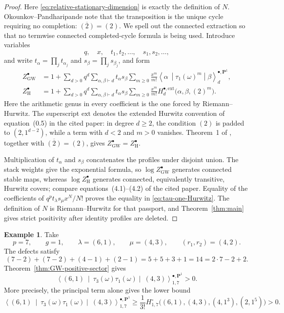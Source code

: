 \documentclass[11pt]{amsart}
\theoremstyle{plain}
\theoremstyle{definition}
\newtheorem{example}[theorem]{Example}
\numberwithin{equation}{section}
\begin{document}
\begin{proof}
Here \eqref{eq:relative-stationary-dimension} is exactly the definition of
$N$.  Okounkov--Pandharipande note that the transposition is the unique
cycle requiring no completion: $\overline{(2)}=(2)$.  We spell out the
connected extraction so that no termwise connected completed-cycle formula
is being used.  Introduce variables
\[
 q,\quad x,\quad t_1,t_2,\ldots,\quad s_1,s_2,\ldots,
\]
and write $t_\alpha=\prod_jt_{\alpha_j}$ and
$s_\beta=\prod_js_{\beta_j}$, and form
\begin{align*}
 Z^\bullet_{\mathrm{GW}}
 &=1+\sum_{d>0}q^d\sum_{\alpha,\beta\vdash d}
   t_\alpha s_\beta\sum_{m\geq0}\frac{x^m}{m!}
   \left\langle\alpha\ \middle|\tau_1(\omega)^m
   \middle|\beta\right\rangle^{\bullet,\mathbf P^1}_{d},\\
 Z^\bullet_{\mathrm H}
 &=1+\sum_{d>0}q^d\sum_{\alpha,\beta\vdash d}
   t_\alpha s_\beta\sum_{m\geq0}\frac{x^m}{m!}
   H^{\bullet,\mathrm{ext}}_d\bigl(\alpha,\beta,(2)^m\bigr).
\end{align*}
Here the arithmetic genus in every coefficient is the one forced by
Riemann--Hurwitz.  The superscript $\mathrm{ext}$ denotes the extended
Hurwitz convention of equation~(0.5) in the cited paper: in degree
$d\geq2$, the condition $(2)$ is padded to $(2,1^{d-2})$, while a term with
$d<2$ and $m>0$ vanishes.  Theorem~1 of
\cite{OkounkovPandharipande}, together with
$\overline{(2)}=(2)$, gives
$Z^\bullet_{\mathrm{GW}}=Z^\bullet_{\mathrm H}$.

Multiplication of $t_\alpha$ and $s_\beta$ concatenates the profiles under
disjoint union.  The stack weights give the exponential formula, so
$\log Z^\bullet_{\mathrm{GW}}$ generates connected stable maps, whereas
$\log Z^\bullet_{\mathrm H}$ generates connected, equivalently transitive,
Hurwitz covers; compare equations~(4.1)--(4.2) of the cited paper.  Equality
of the coefficients of $q^pt_\lambda s_\mu x^N/N!$ proves the equality in
\eqref{eq:tau-one-Hurwitz}.  The definition of $N$ is Riemann--Hurwitz for
that passport, and Theorem~\ref{thm:main} gives strict positivity after
identity profiles are deleted.
\end{proof}

\begin{example}\label{ex:degree-seven-GW}
Take
\[
 p=7,\qquad g=1,\qquad
 \lambda=(6,1),\qquad \mu=(4,3),\qquad (r_1,r_2)=(4,2).
\]
The defects satisfy
\[
 (7-2)+(7-2)+(4-1)+(2-1)=5+5+3+1=14=2\cdot7-2+2.
\]
Theorem~\ref{thm:GW-positive-sector} gives
\[
 \left\langle(6,1)\ \middle|\
  \tau_3(\omega)\tau_1(\omega)
  \middle|\ (4,3)\right\rangle^{\bullet,\mathbf P^1}_{1,7}>0.
\]
More precisely, the principal term alone gives the lower bound
\[
 \left\langle(6,1)\ \middle|\
  \tau_3(\omega)\tau_1(\omega)
  \middle|\ (4,3)\right\rangle^{\bullet,\mathbf P^1}_{1,7}
 \geq\frac1{3!}
 H^\circ_{1,7}\bigl((6,1),(4,3),(4,1^3),(2,1^5)\bigr)>0.
\]
\end{example}
\end{document}
